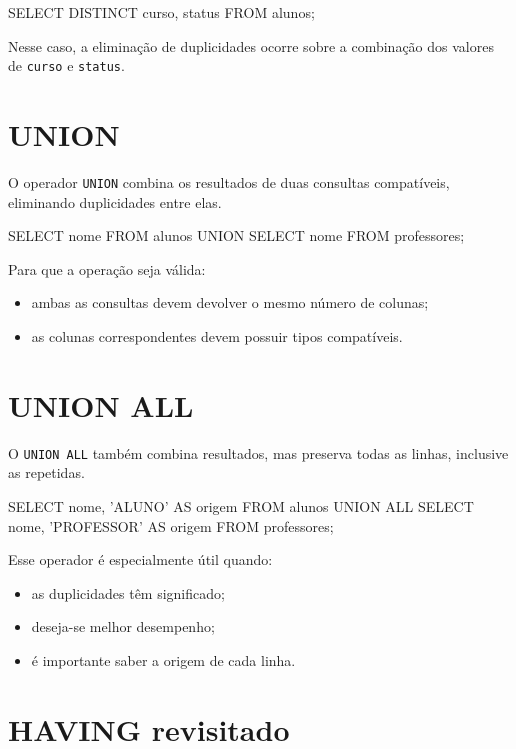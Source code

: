 \begin{sqlcode}
SELECT DISTINCT curso, status
FROM alunos;
\end{sqlcode}

Nesse caso, a eliminação de duplicidades ocorre sobre a combinação dos valores de \texttt{curso} e \texttt{status}.

\section{UNION}

O operador \texttt{UNION} combina os resultados de duas consultas compatíveis, eliminando duplicidades entre elas.

\begin{sqlcode}
SELECT nome
FROM alunos
UNION
SELECT nome
FROM professores;
\end{sqlcode}

Para que a operação seja válida:
\begin{itemize}
    \item ambas as consultas devem devolver o mesmo número de colunas;
    \item as colunas correspondentes devem possuir tipos compatíveis.
\end{itemize}

\section{UNION ALL}

O \texttt{UNION ALL} também combina resultados, mas preserva todas as linhas, inclusive as repetidas.

\begin{sqlcode}
SELECT nome, 'ALUNO' AS origem
FROM alunos
UNION ALL
SELECT nome, 'PROFESSOR' AS origem
FROM professores;
\end{sqlcode}

Esse operador é especialmente útil quando:
\begin{itemize}
    \item as duplicidades têm significado;
    \item deseja-se melhor desempenho;
    \item é importante saber a origem de cada linha.
\end{itemize}

\section{HAVING revisitado}

